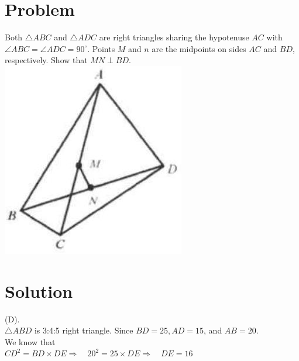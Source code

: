 \documentclass{article}
\begin{document}
\section*{Problem}
Both \(\triangle A B C\) and \(\triangle A D C\) are right triangles sharing the hypotenuse \(A C\) with \(\angle A B C=\angle A D C=90^{\circ}\). Points \(M\) and \(n\) are the midpoints on sides \(A C\) and \(B D\), respectively. Show that \(M N \perp B D\).\\
\centering
\includegraphics[width=\textwidth]{images/016(3).jpg}

\section*{Solution}
(D).\\
\(\triangle A B D\) is 3:4:5 right triangle. Since \(B D=25, A D=15\), and \(A B=20\).\\
We know that\\
\(C D^{2}=B D \times D E \Rightarrow \quad 20^{2}=25 \times D E \Rightarrow \quad D E=16\)
\end{document}
